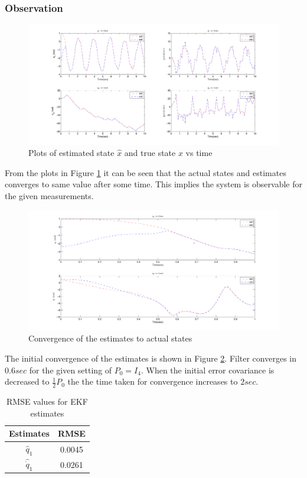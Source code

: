 \subsubsection{Observation}
\begin{figure}
	\centering
	\includegraphics[angle=90,scale=0.5]{Bilder/plots/idp/idp_plot.pdf}
	\caption{ Plots of estimated state $\hat x$ and true state $x$ vs time}
	\label{fig:idp_plot}
\end{figure}

From the plots in Figure \ref{fig:idp_plot} it can be seen that the actual states and estimates converges to same value after some time. This implies the system is observable for the given measurements. 
\begin{figure}
    \centering
    \includegraphics[trim= 30mm 0mm 30mm 0mm,clip,width=\linewidth]{Bilder/plots/idp/init_beh.pdf}
    \caption{ Convergence of the estimates to actual states }
    \label{fig:idp_init_conv}
\end{figure}
The initial convergence of the estimates is shown in Figure \ref{fig:idp_init_conv}. Filter converges in $0.6 sec$ for the given setting of $P_0=I_4$. When the initial error covariance is decreased to $\frac{1}{2}P_0$ the the time taken for convergence increases to $2 sec$. 

\begin{table}[H]
    \centering
    \begin{tabular}{|c|c|}
    \hline
    Estimates &RMSE \\ \hline
    $\hat q_1$   &0.0045 \\ \hline
    $\hat {\dot q}_1$ & 0.0261 \\ \hline
    \end{tabular}
    \caption{RMSE values for EKF estimates}
    \label{tab:idp_rmse_ekf}
\end{table}

